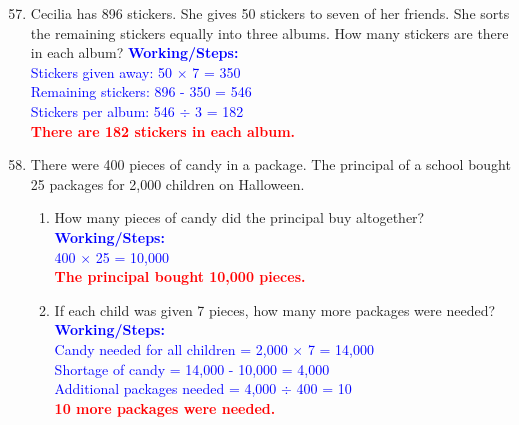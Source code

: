 \documentclass[11pt, a4paper]{article}
\newcommand{\answerline}[1]{\textcolor{red}{\textbf{#1}}}
\newcommand{\working}[1]{\vspace{10pt}\textcolor{blue}{\small \textbf{Working/Steps:}\\ #1}}
\begin{document}
\begin{enumerate}[label=\arabic*.]
    \setcounter{enumi}{56}
    \item Cecilia has 896 stickers. She gives 50 stickers to seven of her friends. She sorts the remaining stickers equally into three albums. How many stickers are there in each album?
    \working{Stickers given away: 50 $\times$ 7 = 350 \\ Remaining stickers: 896 - 350 = 546 \\ Stickers per album: 546 $\div$ 3 = 182 \\ \answerline{There are 182 stickers in each album.}}

    \vspace{4cm}

    \item There were 400 pieces of candy in a package. The principal of a school bought 25 packages for 2,000 children on Halloween.
    
    \begin{enumerate}[label=(\alph*), leftmargin=*]
        \item How many pieces of candy did the principal buy altogether?
        \working{400 $\times$ 25 = 10,000 \\ \answerline{The principal bought 10,000 pieces.}}
        
        \item If each child was given 7 pieces, how many more packages were needed?
        \working{Candy needed for all children = 2,000 $\times$ 7 = 14,000 \\ Shortage of candy = 14,000 - 10,000 = 4,000 \\ Additional packages needed = 4,000 $\div$ 400 = 10 \\ \answerline{10 more packages were needed.}}
    \end{enumerate}

\end{enumerate}

\pagebreak
\end{document}
